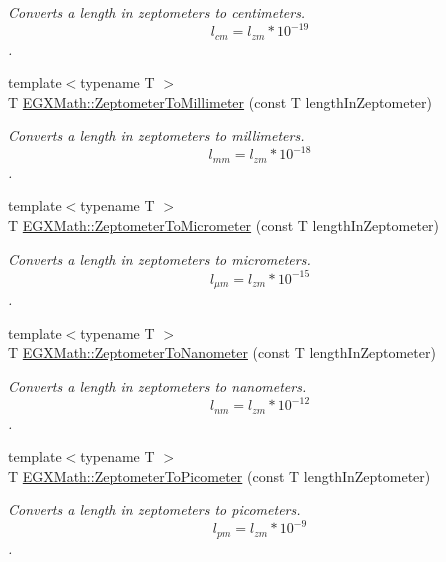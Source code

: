 \begin{DoxyCompactItemize}
\begin{DoxyCompactList}\small\item\em Converts a length in zeptometers to centimeters. \[ l_{cm}=l_{zm} * 10^{-19} \]. \end{DoxyCompactList}\item 
{\footnotesize template$<$typename T $>$ }\\T \mbox{\hyperlink{group___e_g_x_math-_conversions-_length_conversions-_zeptometer-_s_i_ga5caeffbc654c4bfc6390ed822cee42a5}{E\+G\+X\+Math\+::\+Zeptometer\+To\+Millimeter}} (const T length\+In\+Zeptometer)
\begin{DoxyCompactList}\small\item\em Converts a length in zeptometers to millimeters. \[ l_{mm}=l_{zm} * 10^{-18} \]. \end{DoxyCompactList}\item 
{\footnotesize template$<$typename T $>$ }\\T \mbox{\hyperlink{group___e_g_x_math-_conversions-_length_conversions-_zeptometer-_s_i_ga3ff7c51338abdb80d18becf7245a32fd}{E\+G\+X\+Math\+::\+Zeptometer\+To\+Micrometer}} (const T length\+In\+Zeptometer)
\begin{DoxyCompactList}\small\item\em Converts a length in zeptometers to micrometers. \[ l_{\mu m}=l_{zm} * 10^{-15} \]. \end{DoxyCompactList}\item 
{\footnotesize template$<$typename T $>$ }\\T \mbox{\hyperlink{group___e_g_x_math-_conversions-_length_conversions-_zeptometer-_s_i_ga0a9d1243a7723cac27aeb6ed48acc3e8}{E\+G\+X\+Math\+::\+Zeptometer\+To\+Nanometer}} (const T length\+In\+Zeptometer)
\begin{DoxyCompactList}\small\item\em Converts a length in zeptometers to nanometers. \[ l_{nm}=l_{zm} * 10^{-12} \]. \end{DoxyCompactList}\item 
{\footnotesize template$<$typename T $>$ }\\T \mbox{\hyperlink{group___e_g_x_math-_conversions-_length_conversions-_zeptometer-_s_i_gae7409493227692a85b7fa5016a007de3}{E\+G\+X\+Math\+::\+Zeptometer\+To\+Picometer}} (const T length\+In\+Zeptometer)
\begin{DoxyCompactList}\small\item\em Converts a length in zeptometers to picometers. \[ l_{pm}=l_{zm} * 10^{-9} \]. \end{DoxyCompactList}\item 

\end{DoxyCompactItemize}
